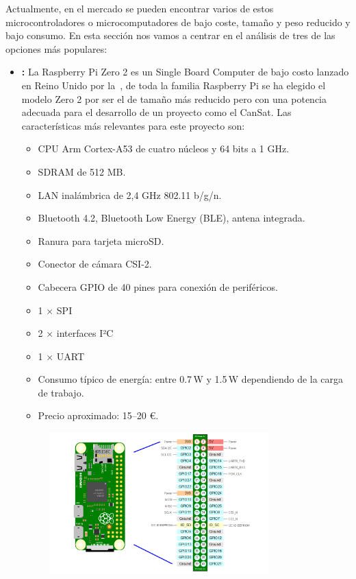 Actualmente, en el mercado se pueden encontrar varios de estos microcontroladores o microcomputadores de bajo coste, tamaño y peso reducido y bajo consumo.
En esta sección nos vamos a centrar en el análisis de tres de las opciones más populares:
\begin{itemize}

    \item \textbf{\cite{raspberrypi_zero2}:}
    La Raspberry Pi Zero 2 es un Single Board Computer de bajo costo lanzado en Reino Unido por la~\cite{raspberrypi_foundation},
    de toda la familia Raspberry Pi se ha elegido el modelo Zero 2 por ser el de tamaño más reducido pero con una potencia adecuada para el desarrollo de un proyecto como el CanSat.
    Las características más relevantes para este proyecto son:
    \begin{itemize}
        \item CPU Arm Cortex-A53 de cuatro núcleos y 64 bits a 1 GHz.
        \item SDRAM de 512 MB.
        \item LAN inalámbrica de 2,4 GHz 802.11 b/g/n.
        \item Bluetooth 4.2, Bluetooth Low Energy (BLE), antena integrada.
        \item Ranura para tarjeta microSD.
        \item Conector de cámara CSI-2.
        \item Cabecera GPIO de 40 pines para conexión de periféricos.
        \item 1 × SPI
        \item 2 × interfaces I²C
        \item 1 × UART
        \item Consumo típico de energía: entre 0.7\,W y 1.5\,W dependiendo de la carga de trabajo.
        \item Precio aproximado: 15–20 €.
    \end{itemize}
    \begin{figure}[h]
        \centering
        \includegraphics[width=0.8\textwidth]{Imagenes/Bitmap/pizero2gpio}

\end{figure}
\end{itemize}
